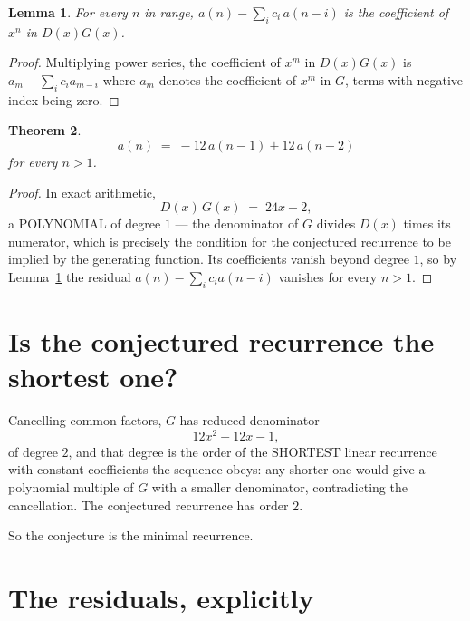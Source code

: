 \documentclass[11pt,a4paper]{article}
\theoremstyle{plain}
\newtheorem{theorem}{Theorem}
\newtheorem{lemma}[theorem]{Lemma}
\theoremstyle{definition}
\begin{document}
\begin{lemma}\label{lem:key}
For every $n$ in range, $a(n)-\sum_i c_i\,a(n-i)$ is the coefficient of $x^{n}$ in
$D(x)G(x)$.
\end{lemma}

\begin{proof}
Multiplying power series, the coefficient of $x^{m}$ in $D(x)G(x)$ is
$a_m-\sum_i c_i a_{m-i}$ where $a_m$ denotes the coefficient of $x^{m}$ in $G$, terms with
negative index being zero.
\end{proof}

\begin{theorem}
\[
a(n)\;=\;-12\,a(n-1) + 12\,a(n-2)
\]
for every $n>1$.
\end{theorem}

\begin{proof}
In exact arithmetic,
\[
D(x)\,G(x)\;=\;24 x + 2,
\]
a POLYNOMIAL of degree $1$ --- the denominator of $G$ divides $D(x)$ times its numerator,
which is precisely the condition for the conjectured recurrence to be implied by the
generating function. Its coefficients vanish beyond degree $1$, so by
Lemma~\ref{lem:key} the residual $a(n)-\sum_ic_ia(n-i)$ vanishes for every
$n>1$.
\end{proof}

\section{Is the conjectured recurrence the shortest one?}

Cancelling common factors, $G$ has reduced denominator
\[
12 x^{2} - 12 x - 1,
\]
of degree $2$, and that degree is the order of the SHORTEST linear recurrence with
constant coefficients the sequence obeys: any shorter one would give a polynomial multiple of
$G$ with a smaller denominator, contradicting the cancellation. The conjectured recurrence has
order $2$.

So the conjecture is the minimal recurrence.

\section{The residuals, explicitly}
\end{document}
